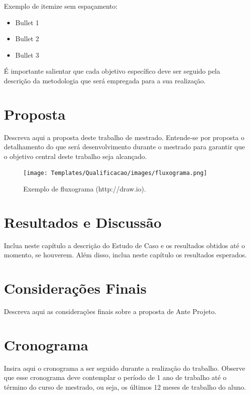 \documentclass[11pt]{article}
\begin{document}
Exemplo de itemize sem espaçamento:

\begin{itemize}
\vskip0.2cm
\item Bullet 1
\item Bullet 2
\item Bullet 3
\end{itemize}

É importante salientar que cada objetivo específico deve ser seguido pela descrição da metodologia que será empregada para a sua realização.

\section{Proposta} \label{ch:metodologia}

Descreva aqui a proposta deste trabalho de mestrado. Entende-se por proposta o detalhamento do que será desenvolvimento durante o mestrado para garantir que o objetivo central deste trabalho seja alcançado.

\begin{figure}[!htb]
 \centering
 \texttt{[image: Templates/Qualificacao/images/fluxograma.png]}
 \caption{\label{fig:fluxograma}Exemplo de fluxograma (http://draw.io).}
\end{figure}

\section{Resultados e Discussão} \label{ch:simulacoes}

Inclua neste capítulo a descrição do Estudo de Caso e os resultados obtidos até o momento, se houverem. Além disso, inclua neste capítulo os resultados esperados. 

\section{Considerações Finais} \label{ch:consideracoes}

Descreva aqui as considerações finais sobre a proposta de Ante Projeto.  

\section{Cronograma} \label{ch:cronograma}

Insira aqui o cronograma a ser seguido durante a realização do trabalho. Observe que esse cronograma deve contemplar o período de 1 ano de trabalho até o término do curso de mestrado, ou seja, os últimos 12 meses de trabalho do aluno.
\end{document}
